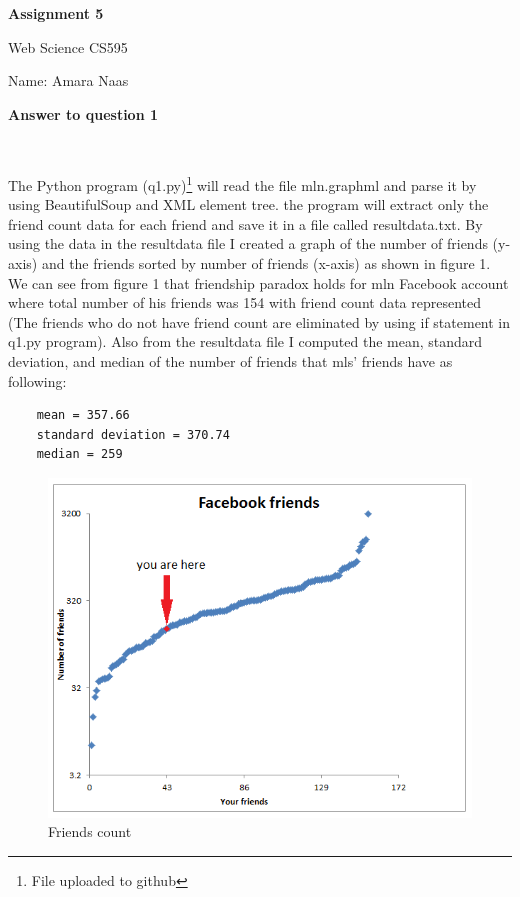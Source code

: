 \documentclass[a4paper,12pt]{article}
\begin{document}
\begin{center}
\begin{Large}


\textbf{Assignment 5}

Web Science CS595

Name: Amara Naas
\end{Large}
\end{center}
\pagebreak

\textbf{Answer to question 1}

$\:$

\par
The Python program (q1.py)\footnote{File uploaded to github} will read the file mln.graphml \footnotemark[1] and parse it by using BeautifulSoup and XML element tree. the program will extract only the friend count data for each friend and save it in a file called resultdata.txt\footnotemark[1]. By using the data in the resultdata file I created a graph of the number of friends (y-axis) and the friends sorted by number of friends (x-axis) as shown in figure 1. We can see from figure 1 that friendship paradox holds for mln Facebook account where total number of his friends was 154 with friend count data represented (The friends who do not have friend count are eliminated by using if statement in q1.py program). Also from the resultdata file I computed the mean, standard deviation, and median of the number of friends that mls' friends have as following:
\begin{lstlisting}
	mean = 357.66
	standard deviation = 370.74
	median = 259
\end{lstlisting}
	
\par

\begin{figure}
	\center
		\includegraphics[width=\linewidth]{FaceFriends.png} 
	\caption{Friends count}
\end{figure}
\end{document}
